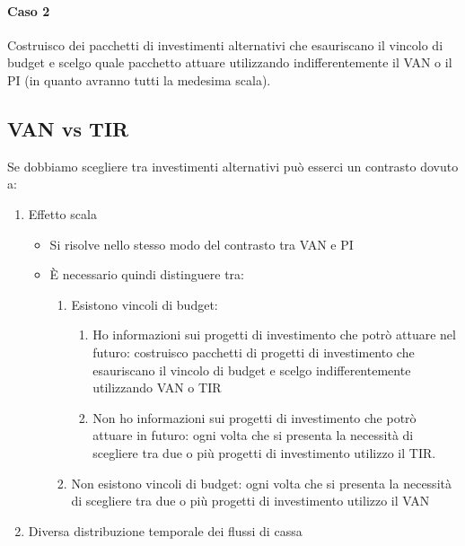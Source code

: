 \paragraph{Caso 2} Costruisco dei pacchetti di investimenti alternativi che esauriscano il vincolo di budget e scelgo
quale pacchetto attuare utilizzando indifferentemente il VAN o il PI (in quanto avranno tutti la medesima
scala).

\subsection{VAN vs TIR}
Se dobbiamo scegliere tra investimenti alternativi può esserci un contrasto dovuto a:
\begin{enumerate}
	\item Effetto scala
	\begin{itemize}
		\item Si risolve nello stesso modo del contrasto tra VAN e PI
		\item È necessario quindi distinguere tra:
		\begin{enumerate}
			\item Esistono vincoli di budget:
			\begin{enumerate}
				\item Ho informazioni sui progetti di investimento che potrò attuare nel futuro: costruisco
				pacchetti di progetti di investimento che esauriscano il vincolo di budget e scelgo
				indifferentemente utilizzando VAN o TIR
				\item Non ho informazioni sui progetti di investimento che potrò attuare in futuro: ogni volta
				che si presenta la necessità di scegliere tra due o più progetti di investimento utilizzo il
TIR.
			\end{enumerate}
			\item Non esistono vincoli di budget: ogni volta che si presenta la necessità di scegliere tra due o
			più progetti di investimento utilizzo il VAN
		\end{enumerate}
	\end{itemize}
	\item Diversa distribuzione temporale dei flussi di cassa
\end{enumerate}

